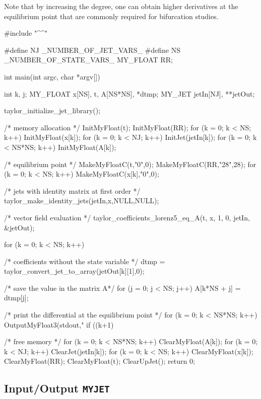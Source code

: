 \documentclass[10pt]{article}
\theoremstyle{remark}
\newcommand{\myjet}{{\tt MY\symbol{95}JET}}
\newcommand{\inputfiles}[1]{%
\ifthenelse{\equal{#1}{sec:ex0}}{{\tt lorenz1.eq}}{%
\ifthenelse{\equal{#1}{sec:ex1}}{{\tt lorenz1.eq}}{%
\ifthenelse{\equal{#1}{sec:ex_params}}{{\tt perturbation.eq}}{%
\ifthenelse{\equal{#1}{sec:ex_lyap}}{{\tt lorenz2.eq}}{%
\ifthenelse{\equal{#1}{sec:ex_varieq}}{{\tt lorenz3.eq}}{%
\ifthenelse{\equal{#1}{sec:ex5}}{{\tt lorenz4.eq}}{%
\ifthenelse{\equal{#1}{sec:ex_omp}}{{\tt lorenz4.eq}}{%
\ifthenelse{\equal{#1}{sec:ex_equilibria}}{{\tt lorenz5.eq}}{%
\ifthenelse{\equal{#1}{sec:ex_myjetaccess}}{{\tt model.eq}}{%
\ifthenelse{\equal{#1}{sec:ex_driving}}{{\tt lorenz1.eq}}{%
\ifthenelse{\equal{#1}{sec:ex_io_myjet}}{{\tt io\symbol{95}myjet.eq}}{%
\ifthenelse{\equal{#1}{sec:ex_uniform}}{{\tt vdp.eq}}{%
ERROR!!!!!}}}}}}}}}}}}%
}
\newcommand{\odecfiles}[1]{%
\ifthenelse{\equal{#1}{sec:ex0}}{{\tt lorenz1.c}}{%
\ifthenelse{\equal{#1}{sec:ex1}}{{\tt lorenz1.c}}{%
\ifthenelse{\equal{#1}{sec:ex_params}}{{\tt perturbation.c}}{%
\ifthenelse{\equal{#1}{sec:ex_lyap}}{{\tt lorenz2.c}}{%
\ifthenelse{\equal{#1}{sec:ex_varieq}}{{\tt lorenz3.c}}{%
\ifthenelse{\equal{#1}{sec:ex5}}{{\tt lorenz4.c}}{%
\ifthenelse{\equal{#1}{sec:ex_omp}}{{\tt lorenz4.c}}{%
\ifthenelse{\equal{#1}{sec:ex_equilibria}}{{\tt lorenz5.c}}{%
\ifthenelse{\equal{#1}{sec:ex_myjetaccess}}{{\tt jdata.c}}{%
\ifthenelse{\equal{#1}{sec:ex_driving}}{{\tt lorenz.c}}{%
\ifthenelse{\equal{#1}{sec:ex_io_myjet}}{{\tt io\symbol{95}myjet.c}}{%
\ifthenelse{\equal{#1}{sec:ex_uniform}}{{\tt vdp.c}}{%
ERROR!!!!!}}}}}}}}}}}}%
}
\newcommand{\odehfiles}[1]{%
\ifthenelse{\equal{#1}{sec:ex0}}{{\tt taylor.h}}{%
\ifthenelse{\equal{#1}{sec:ex1}}{{\tt taylor.h}}{%
\ifthenelse{\equal{#1}{sec:ex_params}}{{\tt taylor.h}}{%
\ifthenelse{\equal{#1}{sec:ex_lyap}}{{\tt lorenz2.h}}{%
\ifthenelse{\equal{#1}{sec:ex_varieq}}{{\tt lorenz3.h}}{%
\ifthenelse{\equal{#1}{sec:ex5}}{{\tt lorenz4.h}}{%
\ifthenelse{\equal{#1}{sec:ex_omp}}{{\tt lorenz4.h}}{%
\ifthenelse{\equal{#1}{sec:ex_equilibria}}{{\tt lorenz5.h}}{%
\ifthenelse{\equal{#1}{sec:ex_myjetaccess}}{{\tt jdata.h}}{%
\ifthenelse{\equal{#1}{sec:ex_driving}}{{\tt taylor.h}}{%
\ifthenelse{\equal{#1}{sec:ex_io_myjet}}{{\tt io\symbol{95}myjet.h}}{%
\ifthenelse{\equal{#1}{sec:ex_uniform}}{{\tt vdp.h}}{%
ERROR!!!!!}}}}}}}}}}}}%
}
\newcommand{\mainfiles}[1]{%
\ifthenelse{\equal{#1}{sec:ex0}}{{\tt main\symbol{95}lrnz.c}}{%
\ifthenelse{\equal{#1}{sec:ex1}}{{\tt main\symbol{95}lrnz.c}}{%
\ifthenelse{\equal{#1}{sec:ex_params}}{{\tt main\symbol{95}params.c}}{%
\ifthenelse{\equal{#1}{sec:ex_lyap}}{{\tt main\symbol{95}lyap.c}}{%
\ifthenelse{\equal{#1}{sec:ex_varieq}}{{\tt main\symbol{95}varieq.c}}{%
\ifthenelse{\equal{#1}{sec:ex5}}{{\tt main4.c}}{%
\ifthenelse{\equal{#1}{sec:ex_omp}}{{\tt main\symbol{95}omp.c}}{%
\ifthenelse{\equal{#1}{sec:ex_equilibria}}{{\tt main\symbol{95}equilibria.c}}{%
\ifthenelse{\equal{#1}{sec:ex_myjetaccess}}{{\tt jdata\symbol{95}main.c}}{%
\ifthenelse{\equal{#1}{sec:ex_io_myjet}}{{\tt io\symbol{95}main.c}}{%
\ifthenelse{\equal{#1}{sec:ex_uniform}}{{\tt main\symbol{95}vdp.c}}{%
ERROR!!!!!}}}}}}}}}}}%
}
\newcommand{\inputfile}{}
\newcommand{\mainfile}{}
\newcommand{\odecfile}{}
\newcommand{\odehfile}{}
\begin{document}
Note that by increasing the degree, one can obtain higher derivatives
at the equilibrium point that are commonly required for bifurcation
studies.
\begin{code}[title={File: \mainfile{}}]
    #include "^\odehfile{}^"

    #define NJ _NUMBER_OF_JET_VARS_
    #define NS _NUMBER_OF_STATE_VARS_
    MY_FLOAT RR;
    
    int main(int argc, char *argv[])
    {
      int k, j;
      MY_FLOAT x[NS], t, A[NS*NS], *dtmp;
      MY_JET jetIn[NJ], **jetOut;
      
      taylor_initialize_jet_library();
      
      /* memory allocation */
      InitMyFloat(t);
      InitMyFloat(RR);
      for (k = 0; k < NS; k++) {InitMyFloat(x[k]);}
      for (k = 0; k < NJ; k++) {InitJet(jetIn[k]);}
      for (k = 0; k < NS*NS; k++) {InitMyFloat(A[k]);}
      
      /* equilibrium point */
      MakeMyFloatC(t,"0",0);
      MakeMyFloatC(RR,"28",28);
      for (k = 0; k < NS; k++) {MakeMyFloatC(x[k],"0",0);}
      
      /* jets with identity matrix at first order */
      taylor_make_identity_jets(jetIn,x,NULL,NULL);
      
      /* vector field evaluation */
      taylor_coefficients_lorenz5_eq_A(t, x, 1, 0, jetIn, &jetOut);
      
      for (k = 0; k < NS; k++) 
      {
        /* coefficients without the state variable */
        dtmp = taylor_convert_jet_to_array(jetOut[k][1],0);
        
        /* save the value in the matrix A*/
        for (j = 0; j < NS; j++) A[k*NS + j] = dtmp[j];   
      }
      
      /* print the differential at the equilibrium point */
      for (k = 0; k < NS*NS; k++) 
      {
        OutputMyFloat3(stdout,"%
        if ((k+1) %
      }
      
      /* free memory */
      for (k = 0; k < NS*NS; k++) {ClearMyFloat(A[k]);}
      for (k = 0; k < NJ; k++) {ClearJet(jetIn[k]);}
      for (k = 0; k < NS; k++) {ClearMyFloat(x[k]);}
      ClearMyFloat(RR); ClearMyFloat(t);
      ClearUpJet();
      return 0;
    }
\end{code}

\subsection{Input/Output \myjet{}} 
\renewcommand{\inputfile}{\inputfiles{sec:ex_io_myjet}}
\renewcommand{\odecfile}{\odecfiles{sec:ex_io_myjet}}
\renewcommand{\odehfile}{\odehfiles{sec:ex_io_myjet}}
\renewcommand{\mainfile}{\mainfiles{sec:ex_io_myjet}}
\end{document}
